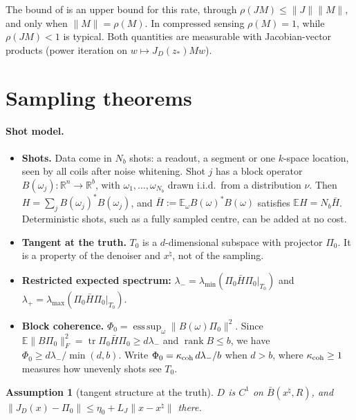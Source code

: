 \documentclass[11pt]{article}
\newtheorem{assumption}[theorem]{Assumption}
\theoremstyle{definition}
\theoremstyle{remark}
\newcommand{\RR}{\mathbb R}
\newcommand{\EE}{\mathbb E}
\newcommand{\norm}[1]{\lVert #1\rVert}
\newcommand{\tr}{\operatorname{tr}}
\newcommand{\lmin}{\lambda_{\min}}
\newcommand{\lmax}{\lambda_{\max}}
\newcommand{\Hb}{\bar H}
\newcommand{\xt}{x^\natural}
\begin{document}
The bound of \cite{hong2024p2np} is an upper bound for this rate, through
$\rho(J M)\leq\norm J\norm M$, and only when $\norm M=\rho(M)$. In compressed sensing $\rho(M)=1$, while
$\rho(JM)<1$ is typical. Both quantities are measurable with Jacobian-vector products (power iteration on
$w\mapsto J_D(z_*)Mw$).

\section{Sampling theorems}\label{sec:sampling}

\paragraph{Shot model.}
\begin{itemize}
\item \textbf{Shots.} Data come in $N_b$ shots: a readout, a segment or one $k$-space location, seen by all coils
  after noise whitening. Shot $j$ has a block operator $B(\omega_j):\RR^n\to\RR^{b}$, with
  $\omega_1,\dots,\omega_{N_b}$ drawn i.i.d.\ from a distribution $\nu$. Then $H=\sum_jB(\omega_j)^*B(\omega_j)$,
  and $\Hb:=\EE_\omega B(\omega)^*B(\omega)$ satisfies $\EE H=N_b\Hb$. Deterministic shots, such as a fully sampled
  centre, can be added at no cost.
\item \textbf{Tangent at the truth.} $T_0$ is a $d$-dimensional subspace with projector $\Pi_0$. It is a property
  of the denoiser and $\xt$, not of the sampling.
\item \textbf{Restricted expected spectrum:} $\lambda_-=\lmin(\Pi_0\Hb\Pi_0|_{T_0})$ and $\lambda_+=\lmax(\Pi_0\Hb\Pi_0|_{T_0})$.
\item \textbf{Block coherence.} $\Phi_0=\operatorname{ess\,sup}_\omega\norm{B(\omega)\Pi_0}^2$. Since
  $\EE\norm{B\Pi_0}_F^2=\tr\Pi_0\Hb\Pi_0\geq d\lambda_-$ and $\operatorname{rank}B\le b$, we have
  $\Phi_0\geq d\lambda_-/\min(d,b)$. Write $\Phi_0=\kappa_{\rm coh}\,d\lambda_-/b$ when $d>b$, where
  $\kappa_{\rm coh}\geq1$ measures how unevenly shots see $T_0$.
\end{itemize}

\begin{assumption}[tangent structure at the truth]\label{ass:D1}
$D$ is $C^1$ on $\bar B(\xt,R)$, and $\norm{J_D(x)-\Pi_0}\leq\eta_0+L_J\norm{x-\xt}$ there.
\end{assumption}
\end{document}
